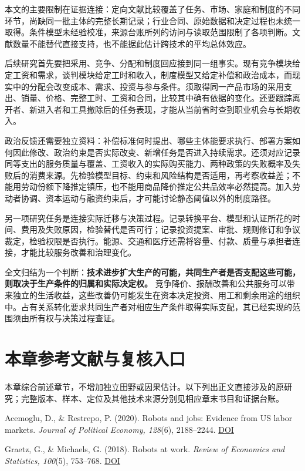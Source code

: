 \documentclass[UTF8,fontset=windows,12pt,a4paper,oneside,openany]{ctexbook}
\begin{document}
本文的主要限制在证据连接：定向文献比较覆盖了任务、市场、家庭和制度的不同环节，尚缺同一批主体的完整长期记录；行业合同、原始数据和决定过程也未统一取得。条件模型未经验校准，来源台账所列的访问与读取范围限制了各项判断。文献数量不能替代直接支持，也不能据此估计跨技术的平均总体效应。

后续研究首先要把采用、竞争、分配和制度回应接到同一组事实。现有竞争模块给定工资和需求，谈判模块给定工时和收入，制度模型又给定补偿和政治成本，而现实中的分配会改变成本、需求、投资与参与条件。须取得同一产品市场的采用支出、销量、价格、完整工时、工资和合同，比较其中确有依据的变化。还要跟踪离开者、新进入者和工具撤除后的任务表现，才能从当前省时查到职业机会与长期收入。

政治反馈还需要独立资料：补偿标准何时提出、哪些主体能要求执行、部署方案如何因此修改、政治约束是否实际改变、新增任务是否进入持续需求。还须对应记录同等支出的服务质量与覆盖、工资收入的实际购买能力、两种政策的失败概率及失败后的消费来源。先检验模型目标、约束和风险结构是否适用，再考察收益差；不能用劳动份额下降推定镇压，也不能用商品降价推定公共品效率必然提高。加入劳动者协调、资本运动与融资约束后，才可能讨论静态阈值以外的制度路径。

另一项研究任务是连接实际迁移与决策过程。记录转换平台、模型和认证所花的时间、费用及失败原因，检验替代是否可行；记录投资提案、审批、规则修订和争议裁定，检验权限是否执行。能源、交通和医疗还需将容量、付款、质量与承担者连接，才能比较服务改善和治理变化。

全文归结为一个判断：\textbf{技术进步扩大生产的可能，共同生产者是否支配这些可能，则取决于生产条件的归属和实际决定权。} 竞争降价、报酬改善和公共服务可以带来独立的生活收益，这些改善仍可能发生在资本决定投资、用工和剩余用途的组织中。占有关系转化要求共同生产者对相应生产条件取得实际支配，其已经实现的范围须由所有权与决策过程查证。

\section{本章参考文献与复核入口}

本章综合前述章节，不增加独立田野或因果估计。以下列出正文直接涉及的原研究；完整版本、样本、定位及其他技术来源分别见相应章末书目和证据台账。

Acemoglu, D., \& Restrepo, P. (2020). Robots and jobs: Evidence from US labor markets. \emph{Journal of Political Economy, 128}(6), 2188–2244. \href{https://doi.org/10.1086/705716}{DOI}

Graetz, G., \& Michaels, G. (2018). Robots at work. \emph{Review of Economics and Statistics, 100}(5), 753–768. \href{https://doi.org/10.1162/rest_a_00754}{DOI}
\end{document}

